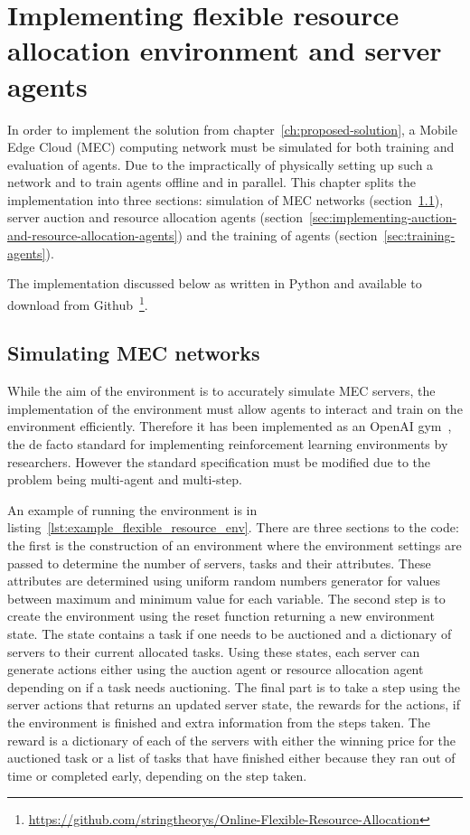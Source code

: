 

\chapter{Implementing flexible resource allocation environment and server agents}\label{ch:implementation-of-the-solution}
In order to implement the solution from chapter~\ref{ch:proposed-solution}, a Mobile Edge Cloud (MEC) computing network
must be simulated for both training and evaluation of agents. Due to the impractically of physically setting up
such a network and to train agents offline and in parallel. This chapter splits the implementation into three sections:
simulation of MEC networks (section~\ref{sec:simulating-mec-networks}), server auction and resource
allocation agents (section~\ref{sec:implementing-auction-and-resource-allocation-agents}) and the training of agents
(section~\ref{sec:training-agents}).

The implementation discussed below as written in Python and available to download from
Github~\footnote{\url{https://github.com/stringtheorys/Online-Flexible-Resource-Allocation}}.

\section{Simulating MEC networks}\label{sec:simulating-mec-networks}
While the aim of the environment is to accurately simulate MEC servers, the implementation of the environment must
allow agents to interact and train on the environment efficiently. Therefore it has been implemented
as an OpenAI gym~\citep{openaigym}, the de facto standard for implementing reinforcement learning environments by
researchers. However the standard specification must be modified due to the problem being multi-agent and multi-step.

An example of running the environment is in listing~\ref{lst:example_flexible_resource_env}. There are three
sections to the code: the first is the construction of an environment where the environment settings
are passed to determine the number of servers, tasks and their attributes. These attributes are determined using
uniform random numbers generator for values between maximum and minimum value for each variable. The second step is to
create the environment using the reset function returning a new environment state.
The state contains a task if one needs to be auctioned and a dictionary of servers to their current
allocated tasks. Using these states, each server can generate actions either using the auction agent or resource
allocation agent depending on if a task needs auctioning. The final part is to take a step using the server actions
that returns an updated server state, the rewards for the actions, if the environment is finished and extra information
from the steps taken. The reward is a dictionary of each of the servers with either the winning price for the auctioned
task or a list of tasks that have finished either because they ran out of time or completed early, depending on the
step taken.


